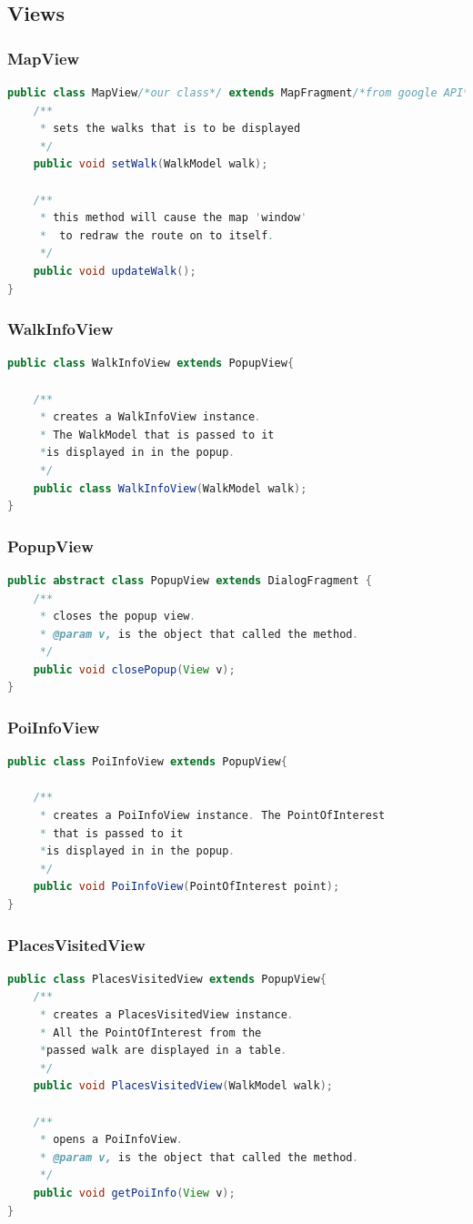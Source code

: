 \documentclass[12pt]{article}
\begin{document}
\subsection{Views}
\subsubsection{MapView}
\begin{lstlisting}[language=java]
public class MapView/*our class*/ extends MapFragment/*from google API*/{
	/**
	 * sets the walks that is to be displayed
	 */	
	public void setWalk(WalkModel walk);
		
	/**
	 * this method will cause the map 'window' 
	 *	to redraw the route on to itself.
	 */
	public void updateWalk();
}
\end{lstlisting}
\subsubsection{WalkInfoView}
\begin{lstlisting}[language=java]
public class WalkInfoView extends PopupView{

	/**
	 * creates a WalkInfoView instance.
	 * The WalkModel that is passed to it 
	 *is displayed in in the popup.  
	 */
	public class WalkInfoView(WalkModel walk);
}
\end{lstlisting}
\subsubsection{PopupView}
\begin{lstlisting}[language=java]
public abstract class PopupView extends DialogFragment {
	/**
	 * closes the popup view.
	 * @param v, is the object that called the method.
	 */
	public void closePopup(View v);
}
\end{lstlisting}
\subsubsection{PoiInfoView}
\begin{lstlisting}[language=java]
public class PoiInfoView extends PopupView{		
			
	/**
	 * creates a PoiInfoView instance. The PointOfInterest
	 * that is passed to it
	 *is displayed in in the popup.  
	 */
	public void PoiInfoView(PointOfInterest point);
}
\end{lstlisting}
\subsubsection{PlacesVisitedView}
\begin{lstlisting}[language=java]
public class PlacesVisitedView extends PopupView{
	/**
	 * creates a PlacesVisitedView instance.
	 * All the PointOfInterest from the 	
	 *passed walk are displayed in a table.
	 */
	public void PlacesVisitedView(WalkModel walk);		

	/**
	 * opens a PoiInfoView.
	 * @param v, is the object that called the method.
	 */
	public void getPoiInfo(View v);
}
\end{lstlisting}
\end{document}

